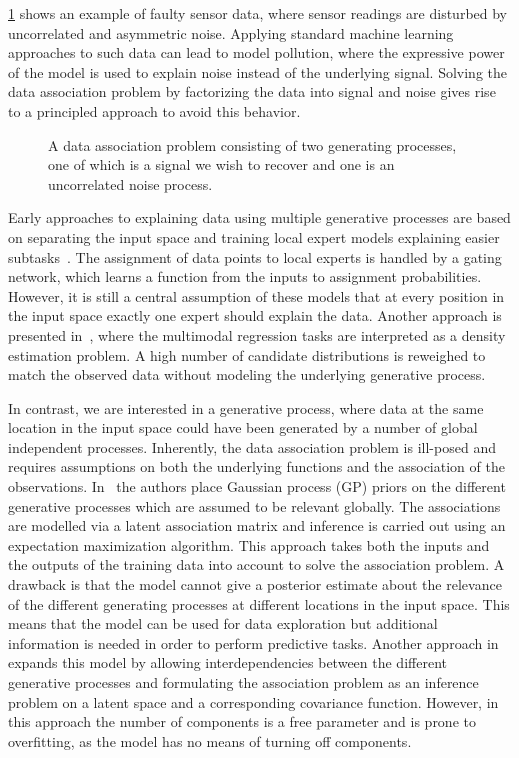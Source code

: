 \cref{fig:data_association:choicenet_data} shows an example of faulty sensor data, where sensor readings are disturbed by uncorrelated and asymmetric noise.
Applying standard machine learning approaches to such data can lead to model pollution, where the expressive power of the model is used to explain noise instead of the underlying signal.
Solving the data association problem by factorizing the data into signal and noise gives rise to a principled approach to avoid this behavior.

\begin{figure}[t]
    \centering
    
    \caption{
        \label{fig:data_association:choicenet_data}
        A data association problem consisting of two generating processes, one of which is a signal we wish to recover and one is an uncorrelated noise process.
    }
\end{figure}
Early approaches to explaining data using multiple generative processes are based on separating the input space and training local expert models explaining easier subtasks~\parencite{jacobs_adaptive_1991,tresp_mixtures_2001, rasmussen_infinite_2002}.
The assignment of data points to local experts is handled by a gating network, which learns a function from the inputs to assignment probabilities.
However, it is still a central assumption of these models that at every position in the input space exactly one expert should explain the data.
Another approach is presented in~\parencite{bishop_mixture_1994}, where the multimodal regression tasks are interpreted as a density estimation problem.
A high number of candidate distributions is reweighed to match the observed data without modeling the underlying generative process.

In contrast, we are interested in a generative process, where data at the same location in the input space could have been generated by a number of global independent processes.
Inherently, the data association problem is ill-posed and requires assumptions on both the underlying functions and the association of the observations.
In~\parencite{lazaro-gredilla_overlapping_2012} the authors place Gaussian process (GP) priors on the different generative processes which are assumed to be relevant globally.
The associations are modelled via a latent association matrix and inference is carried out using an expectation maximization algorithm.
This approach takes both the inputs and the outputs of the training data into account to solve the association problem.
A drawback is that the model cannot give a posterior estimate about the relevance of the different generating processes at different locations in the input space.
This means that the model can be used for data exploration but additional information is needed in order to perform predictive tasks.
Another approach in~\parencite{bodin_latent_2017} expands this model by allowing interdependencies between the different generative processes and formulating the association problem as an inference problem on a latent space and a corresponding covariance function.
However, in this approach the number of components is a free parameter and is prone to overfitting, as the model has no means of turning off components.

